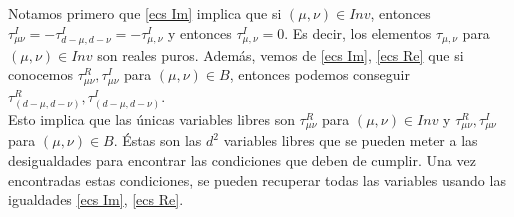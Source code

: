 Notamos primero que \ref{ecs Im} implica que si $(\mu,\nu) \in Inv$, entonces $\tau_{\mu\nu}^I = - \tau_{d-\mu, d-\nu}^I = -\tau_{\mu,\nu}^I$ y entonces $\tau_{\mu,\nu}^I = 0$. Es decir, los elementos $\tau_{\mu,\nu}$ para $(\mu,\nu) \in Inv$ son reales puros. 
Además, vemos de \ref{ecs Im}, \ref{ecs Re} que si conocemos $\tau_{\mu\nu}^R , \tau_{\mu \nu}^I$ para $(\mu,\nu)\in B$, entonces podemos conseguir $\tau_{(d-\mu,d-\nu)}^R , \tau_{(d-\mu,d-\nu)}^I$. \\ 

Esto implica que las únicas variables libres son $\tau_{\mu\nu}^R$ para $(\mu,\nu) \in Inv$ y $\tau_{\mu\nu}^R, \tau_{\mu\nu}^I$ para $(\mu,\nu) \in B$. 
Éstas son las $d^2$ variables libres que se pueden meter a las desigualdades
para encontrar las condiciones que deben de cumplir.
Una vez encontradas estas condiciones, se 
pueden recuperar todas las variables
usando las igualdades \ref{ecs Im}, \ref{ecs Re}.

